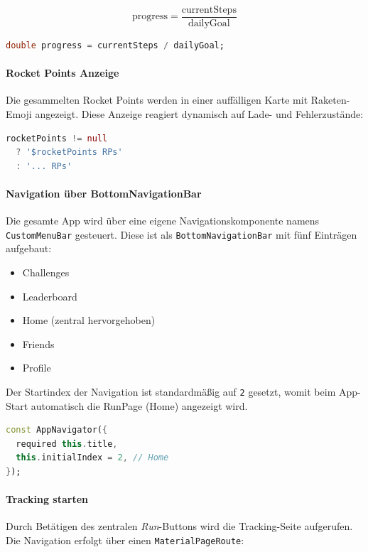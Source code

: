 \documentclass[11pt,a4paper]{article}
\begin{document}
\[
\text{progress} = \frac{\text{currentSteps}}{\text{dailyGoal}}
\]

\begin{lstlisting}[language=Dart, caption=Progressberechnung im StepCounterWidget]
double progress = currentSteps / dailyGoal;
\end{lstlisting}

\paragraph{Rocket Points Anzeige}
Die gesammelten Rocket Points werden in einer auffälligen Karte mit Raketen-Emoji angezeigt. Diese Anzeige reagiert dynamisch auf Lade- und Fehlerzustände:

\begin{lstlisting}[language=Dart]
rocketPoints != null
  ? '$rocketPoints RPs'
  : '... RPs'
\end{lstlisting}

\paragraph{Navigation über BottomNavigationBar}
Die gesamte App wird über eine eigene Navigationskomponente namens \texttt{CustomMenuBar} gesteuert. Diese ist als \texttt{BottomNavigationBar} mit fünf Einträgen aufgebaut:

\begin{itemize}
    \item Challenges
    \item Leaderboard
    \item Home (zentral hervorgehoben)
    \item Friends
    \item Profile
\end{itemize}

Der Startindex der Navigation ist standardmäßig auf \texttt{2} gesetzt, womit beim App-Start automatisch die RunPage (Home) angezeigt wird.

\begin{lstlisting}[language=Dart, caption=Initiale Seitenauswahl im AppNavigator]
const AppNavigator({
  required this.title,
  this.initialIndex = 2, // Home
});
\end{lstlisting}

\paragraph{Tracking starten}
Durch Betätigen des zentralen \textit{Run}-Buttons wird die Tracking-Seite aufgerufen. Die Navigation erfolgt über einen \texttt{MaterialPageRoute}:
\end{document}
